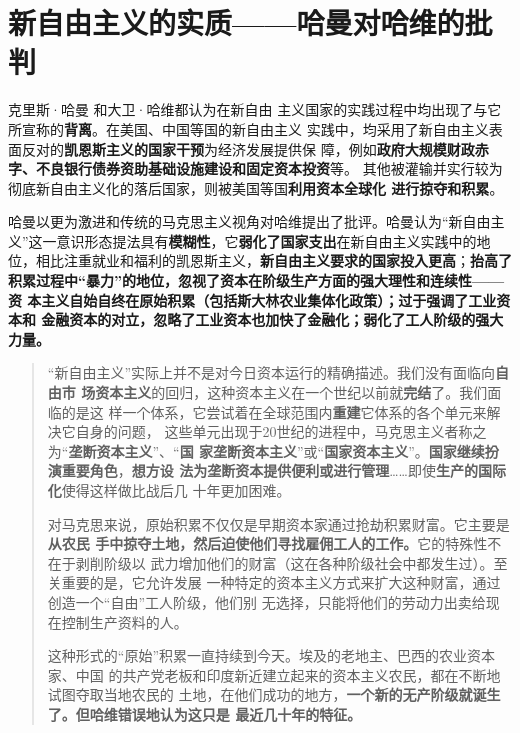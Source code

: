 \section[新自由主义的实质]{新自由主义的实质——哈曼对哈维的批判}

克里斯·哈曼\cite{chrisharmanneo1} \cite{chrisharmanneo2}和大卫·哈维都认为在新自由
主义国家的实践过程中均出现了与它所宣称的\textbf{背离}。在美国、中国等国的新自由主义
实践中，均采用了新自由主义表面反对的\textbf{凯恩斯主义的国家干预}为经济发展提供保
障，例如\textbf{政府大规模财政赤字、不良银行债券资助基础设施建设和固定资本投资}等。
其他被灌输并实行较为彻底新自由主义化的落后国家，则被美国等国\textbf{利用资本全球化
  进行掠夺和积累}。

哈曼以更为激进和传统的马克思主义视角对哈维提出了批评。哈曼认为“新自由主
义”这一意识形态提法具有\textbf{模糊性}，它\textbf{弱化了国家支出}在新自由主义实践中的地
位，相比注重就业和福利的凯恩斯主义，\textbf{新自由主义要求的国家投入更高}；\textbf{抬高了
  积累过程中“暴力”的地位，忽视了资本在阶级生产方面的强大理性和连续性——资
  本主义自始自终在原始积累（包括斯大林农业集体化政策）；过于强调了工业资本和
  金融资本的对立，忽略了工业资本也加快了金融化；弱化了工人阶级的强大力量。}

\begin{quotation}
  “新自由主义”实际上并不是对今日资本运行的精确描述。我们没有面临向\textbf{自由市
    场资本主义}的回归，这种资本主义在一个世纪以前就\textbf{完结}了。我们面临的是这
  样一个体系，它尝试着在全球范围内\textbf{重建}它体系的各个单元来解决它自身的问题，
  这些单元出现于20世纪的进程中，马克思主义者称之为“\textbf{垄断资本主义}”、“\textbf{国
    家垄断资本主义}”或“\textbf{国家资本主义}”。\textbf{国家继续扮演重要角色}，\textbf{想方设
    法为垄断资本提供便利或进行管理}……即使\textbf{生产的国际化}使得这样做比战后几
  十年更加困难。

  对马克思来说，原始积累不仅仅是早期资本家通过抢劫积累财富。它主要是\textbf{从农民
    手中掠夺土地，然后迫使他们寻找雇佣工人的工作。}它的特殊性不在于剥削阶级以
  武力增加他们的财富（这在各种阶级社会中都发生过）。至关重要的是，它允许发展
  一种特定的资本主义方式来扩大这种财富，通过创造一个“自由”工人阶级，他们别
  无选择，只能将他们的劳动力出卖给现在控制生产资料的人。

  这种形式的“原始”积累一直持续到今天。埃及的老地主、巴西的农业资本家、中国
  的共产党老板和印度新近建立起来的资本主义农民，都在不断地试图夺取当地农民的
  土地，在他们成功的地方，\textbf{一个新的无产阶级就诞生了。但哈维错误地认为这只是
    最近几十年的特征。}
\end{quotation}


